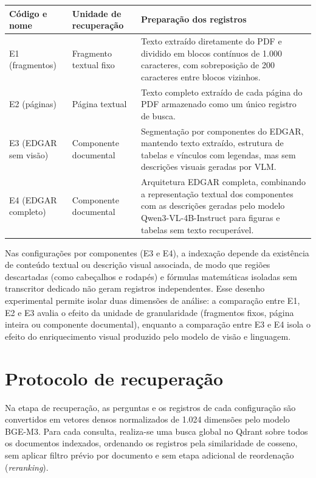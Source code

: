 \begin{quadro}[H]
\centering
\caption{Configurações definidas para a avaliação experimental comparativa.}
\label{quad:configuracoes_comparativas}
\begingroup
\small
\renewcommand{\arraystretch}{1.2}
\begin{tabularx}{\textwidth}{|p{2.6cm}|p{3.6cm}|X|}
\hline
\textbf{Código e nome} & \textbf{Unidade de recuperação} & \textbf{Preparação dos registros} \\
\hline
E1 (fragmentos) & Fragmento textual fixo & Texto extraído diretamente do PDF e dividido em blocos contínuos de 1.000 caracteres, com sobreposição de 200 caracteres entre blocos vizinhos. \\
\hline
E2 (páginas) & Página textual & Texto completo extraído de cada página do PDF armazenado como um único registro de busca. \\
\hline
E3 (EDGAR sem visão) & Componente documental & Segmentação por componentes do EDGAR, mantendo texto extraído, estrutura de tabelas e vínculos com legendas, mas sem descrições visuais geradas por VLM. \\
\hline
E4 (EDGAR completo) & Componente documental & Arquitetura EDGAR completa, combinando a representação textual dos componentes com as descrições geradas pelo modelo Qwen3-VL-4B-Instruct para figuras e tabelas sem texto recuperável. \\
\hline
\end{tabularx}
\endgroup
{}
\end{quadro}

Nas configurações por componentes (E3 e E4), a indexação depende da existência de conteúdo textual ou descrição visual associada, de modo que regiões descartadas (como cabeçalhos e rodapés) e fórmulas matemáticas isoladas sem transcritor dedicado não geram registros independentes. Esse desenho experimental permite isolar duas dimensões de análise: a comparação entre E1, E2 e E3 avalia o efeito da unidade de granularidade (fragmentos fixos, página inteira ou componente documental), enquanto a comparação entre E3 e E4 isola o efeito do enriquecimento visual produzido pelo modelo de visão e linguagem.

\section{Protocolo de recuperação}
\label{sec:protocolo_recuperacao}

Na etapa de recuperação, as perguntas e os registros de cada configuração são convertidos em vetores densos normalizados de 1.024 dimensões pelo modelo BGE-M3. Para cada consulta, realiza-se uma busca global no Qdrant sobre todos os documentos indexados, ordenando os registros pela similaridade de cosseno, sem aplicar filtro prévio por documento e sem etapa adicional de reordenação (\textit{reranking}).

